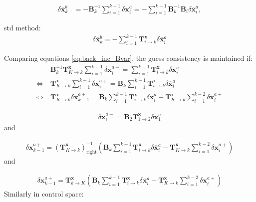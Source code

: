 \documentclass[npg, manuscript]{copernicus}
\begin{document}
\begin{align}
\label{eq:back_inc_B_diff2}
\delta \overline{\mathbf{x}}^b_k & = - \mathbf{B}_k^{-1}\sum_{i=1}^{k-1} \delta \mathbf{x}^a_i = - \sum_{i=1}^{k-1} \mathbf{B}_k^{-1} \mathbf{B}_i \delta \overline{\mathbf{x}}^a_i,
\end{align}

std method:
\begin{align}
\label{eq:back_inc_Bvar}
\boxed{\delta \overline{\mathbf{x}}^b_k = - \sum_{i=1}^{k-1} \mathbf{T}^\mathbf{x}_{i \rightarrow k} \delta \overline{\mathbf{x}}^a_i}
\end{align}

Comparing equations \eqref{eq:back_inc_Bvar}, the guess consistency is maintained if:
\begin{align}
\label{eq:general_condition_B}
& \mathbf{B}^{-1}_k \mathbf{T}^\mathbf{x}_{K \rightarrow k} \sum_{i=1}^{k-1} \delta \mathbf{x}^{a+}_i = \sum_{i=1}^{k-1} \mathbf{T}^\mathbf{x}_{i \rightarrow k} \delta \overline{\mathbf{x}}^a_i \nonumber \\
\Leftrightarrow \ & \mathbf{T}^\mathbf{x}_{K \rightarrow k} \sum_{i=1}^{k-1} \delta \mathbf{x}^{a+}_i = \mathbf{B}_k \sum_{i=1}^{k-1} \mathbf{T}^\mathbf{x}_{i \rightarrow k} \delta \overline{\mathbf{x}}^a_i \nonumber \\
 \Leftrightarrow \ & \boxed{\mathbf{T}^\mathbf{x}_{K \rightarrow k} \delta \mathbf{x}^{a+}_{k-1} =  \mathbf{B}_k \sum_{i=1}^{k-1} \mathbf{T}^\mathbf{x}_{i \rightarrow k} \delta \overline{\mathbf{x}}^a_i - \mathbf{T}^\mathbf{x}_{K \rightarrow k} \sum_{i=1}^{k-2} \delta \mathbf{x}^{a+}_i}
\end{align}


\begin{align}
\label{eq:general_condition_B_K2}
\delta \mathbf{x}^{a+}_1 =  \mathbf{B}_2 \mathbf{T}^\mathbf{x}_{1 \rightarrow 2} \delta \overline{\mathbf{x}}^a_1
\end{align}
and

\begin{align}
\label{eq:general_condition_B_right_inverse}
\delta \mathbf{x}^{a+}_{k-1} =  \left(\mathbf{T}^\mathbf{x}_{K \rightarrow k}\right)^{-1}_\text{right} \left(\mathbf{B}_k \sum_{i=1}^{k-1} \mathbf{T}^\mathbf{x}_{i \rightarrow k} \delta \overline{\mathbf{x}}^a_i - \mathbf{T}^\mathbf{x}_{K \rightarrow k} \sum_{i=1}^{k-2} \delta \mathbf{x}^{a+}_i\right)
\end{align}
and

\begin{align}
\label{eq:transitive_condition_B}
\boxed{\delta \mathbf{x}^{a+}_{k-1} = \mathbf{T}^\mathbf{x}_{k \rightarrow K} \left(\mathbf{B}_k \sum_{i=1}^{k-1} \mathbf{T}^\mathbf{x}_{i \rightarrow k} \delta \overline{\mathbf{x}}^a_i - \mathbf{T}^\mathbf{x}_{K \rightarrow k} \sum_{i=1}^{k-2} \delta \mathbf{x}^{a+}_i\right)}
\end{align}
Similarly in control space:
\end{document}
